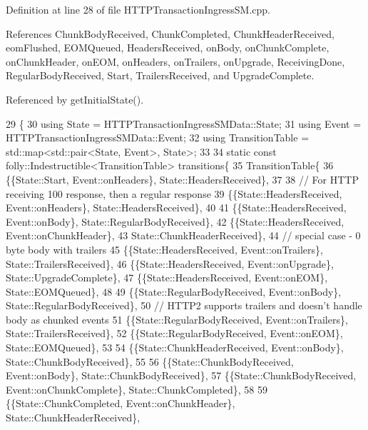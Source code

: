 Definition at line 28 of file H\+T\+T\+P\+Transaction\+Ingress\+S\+M.\+cpp.



References Chunk\+Body\+Received, Chunk\+Completed, Chunk\+Header\+Received, eom\+Flushed, E\+O\+M\+Queued, Headers\+Received, on\+Body, on\+Chunk\+Complete, on\+Chunk\+Header, on\+E\+OM, on\+Headers, on\+Trailers, on\+Upgrade, Receiving\+Done, Regular\+Body\+Received, Start, Trailers\+Received, and Upgrade\+Complete.



Referenced by get\+Initial\+State().


\begin{DoxyCode}
29                                                                         \{
30   \textcolor{keyword}{using} State = HTTPTransactionIngressSMData::State;
31   \textcolor{keyword}{using} Event = HTTPTransactionIngressSMData::Event;
32   \textcolor{keyword}{using} TransitionTable = std::map<std::pair<State, Event>, State>;
33 
34   \textcolor{keyword}{static} \textcolor{keyword}{const} folly::Indestructible<TransitionTable> transitions\{
35     TransitionTable\{
36     \{\{State::Start, Event::onHeaders\}, State::HeadersReceived\},
37 
38     \textcolor{comment}{// For HTTP receiving 100 response, then a regular response}
39     \{\{State::HeadersReceived, Event::onHeaders\}, State::HeadersReceived\},
40 
41     \{\{State::HeadersReceived, Event::onBody\}, State::RegularBodyReceived\},
42     \{\{State::HeadersReceived, Event::onChunkHeader\},
43      State::ChunkHeaderReceived\},
44     \textcolor{comment}{// special case - 0 byte body with trailers}
45     \{\{State::HeadersReceived, Event::onTrailers\}, State::TrailersReceived\},
46     \{\{State::HeadersReceived, Event::onUpgrade\}, State::UpgradeComplete\},
47     \{\{State::HeadersReceived, Event::onEOM\}, State::EOMQueued\},
48 
49     \{\{State::RegularBodyReceived, Event::onBody\}, State::RegularBodyReceived\},
50     \textcolor{comment}{// HTTP2 supports trailers and doesn't handle body as chunked events}
51     \{\{State::RegularBodyReceived, Event::onTrailers\}, State::TrailersReceived\},
52     \{\{State::RegularBodyReceived, Event::onEOM\}, State::EOMQueued\},
53 
54     \{\{State::ChunkHeaderReceived, Event::onBody\}, State::ChunkBodyReceived\},
55 
56     \{\{State::ChunkBodyReceived, Event::onBody\}, State::ChunkBodyReceived\},
57     \{\{State::ChunkBodyReceived, Event::onChunkComplete\}, State::ChunkCompleted\},
58 
59     \{\{State::ChunkCompleted, Event::onChunkHeader\}, State::ChunkHeaderReceived\},

\end{DoxyCode}
